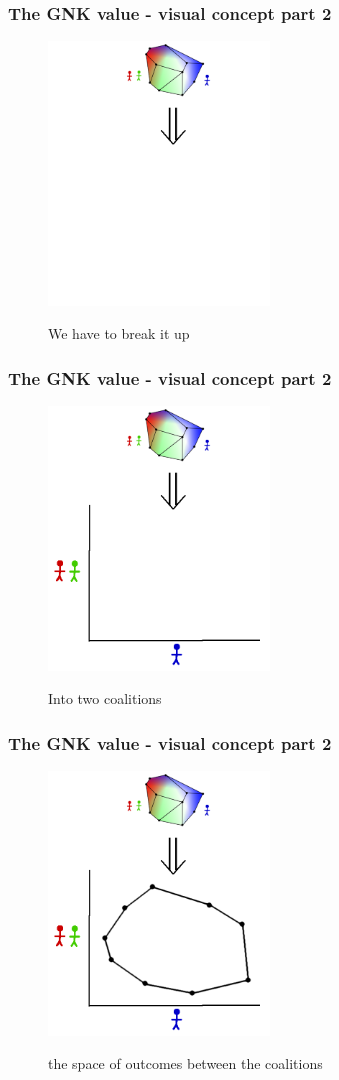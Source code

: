 \documentclass{beamer}
\begin{document}
\begin{frame} \frametitle{The GNK value - visual concept part 2} \begin{figure} \begin{center} \includegraphics[height=7cm]{figs/pa1} \end{center} We have to break it up \end{figure} \end{frame}
\begin{frame} \frametitle{The GNK value - visual concept part 2} \begin{figure} \begin{center} \includegraphics[height=7cm]{figs/pa2} \end{center} Into two coalitions \end{figure} \end{frame}
\begin{frame} \frametitle{The GNK value - visual concept part 2} \begin{figure} \begin{center} \includegraphics[height=7cm]{figs/pa3} \end{center} the space of outcomes between the coalitions \end{figure} \end{frame}
\end{document}
